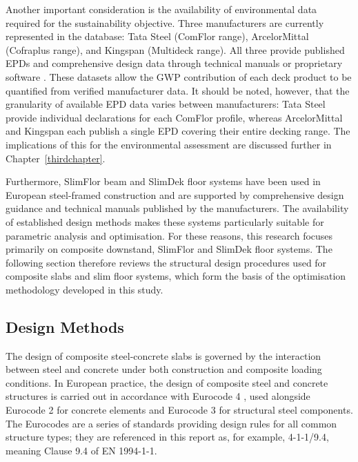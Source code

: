 Another important consideration is the availability of environmental data required for the sustainability objective. Three manufacturers are currently represented in the database: Tata Steel (ComFlor range), ArcelorMittal (Cofraplus range), and Kingspan (Multideck range). All three provide published EPDs and comprehensive design data through technical manuals or proprietary software \citep{RefWorks:2017comflor, RefWorks:2021floors, RefWorks:kingspan2026multideck}. These datasets allow the GWP contribution of each deck product to be quantified from verified manufacturer data. It should be noted, however, that the granularity of available EPD data varies between manufacturers: Tata Steel provide individual declarations for each \mbox{ComFlor} profile, whereas ArcelorMittal and Kingspan each publish a single EPD covering their entire decking range. The implications of this for the environmental assessment are discussed further in Chapter~\ref{thirdchapter}.

Furthermore, SlimFlor beam and SlimDek floor systems have been used in European steel-framed construction and are supported by comprehensive design guidance and technical manuals published by the manufacturers. The availability of established design methods makes these systems particularly suitable for parametric analysis and optimisation. For these reasons, this research focuses primarily on composite downstand, SlimFlor and SlimDek floor systems. The following section therefore reviews the structural design procedures used for composite slabs and slim floor systems, which form the basis of the optimisation methodology developed in this study.
\subsection{Design Methods}
The design of composite steel-concrete slabs is governed by the interaction between steel and concrete under both construction and composite loading conditions. In European practice, the design of composite steel and concrete structures is carried out in accordance with Eurocode 4 \citep{RefWorks:cen2004en4}, used alongside Eurocode 2 \citep{RefWorks:cen2004en2} for concrete elements and Eurocode 3 \citep{RefWorks:cen2005en3} for structural steel components. The Eurocodes are a series of standards providing design rules for all common structure types; they are referenced in this report as, for example, 4-1-1/9.4, meaning Clause 9.4 of EN 1994-1-1.

